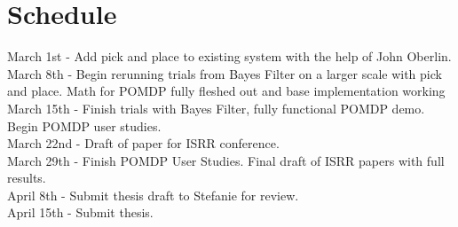 \documentclass[a4paper, 11pt]{article} %
\begin{document}
\section*{Schedule}
March 1st - Add pick and place to existing system with the help of John Oberlin.\\
March 8th - Begin rerunning trials from Bayes Filter on a larger scale with pick and place. Math for POMDP fully fleshed out and base implementation working\\
March 15th - Finish trials with Bayes Filter, fully functional POMDP demo. Begin POMDP user studies.\\
March 22nd - Draft of paper for ISRR conference.\\
March 29th - Finish POMDP User Studies. Final draft of ISRR papers with full results.\\
April 8th - Submit thesis draft to Stefanie for review.\\
April 15th - Submit thesis.
\end{document}
